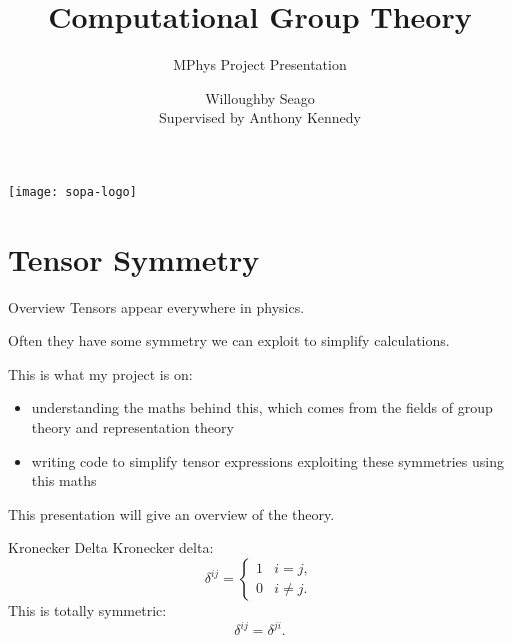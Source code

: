 \documentclass{beamer}
\title{Computational Group Theory}
\subtitle{MPhys Project Presentation}
\author{Willoughby Seago\texorpdfstring{\\}{} Supervised by Anthony Kennedy}
\institute{The University of Edinburgh}
\date{}
\newcommand{\define}[1]{\alert{#1}}
\begin{document}
    
    \begin{frame}
        \vspace{2ex}
        \texttt{[image: sopa-logo]}\\
        \vspace*{-1.93cm}
        \titlepage
    \end{frame}
    
    \begin{frame}
        \tableofcontents
    \end{frame}
    
    \section{Tensor Symmetry}
    \begin{frame}{Overview}
        Tensors appear everywhere in physics.
        
        Often they have some symmetry we can exploit to simplify calculations.
        
        This is what my project is on:
        \begin{itemize}
            \item\pause understanding the maths behind this, which comes from the fields of group theory and representation theory
            \item\pause writing code to simplify tensor expressions exploiting these symmetries using this maths
        \end{itemize}
        \pause
        This presentation will give an overview of the theory.
    \end{frame}

    \begin{frame}{Kronecker Delta}
        Kronecker delta:
        \begin{equation*}
            \delta^{ij} = 
            \begin{cases}
                1 & i = j,\\
                0 & i \ne j.
            \end{cases}
        \end{equation*}
        This is \define{totally symmetric}:
        \begin{equation*}
            \delta^{ij} = \delta^{ji}.
        \end{equation*}
    \end{frame}
    
\end{document}
